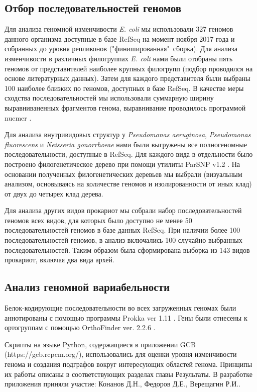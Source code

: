 \subsection{Отбор последовательностей геномов}
Для анализа геномной изменчивости \textit{E. coli} мы использовали 327 геномов данного организма доступные в базе RefSeq на момент ноября 2017 года и собранных до уровня репликонов ("финишированная"\ сборка). Для анализа изменчивости в различных филогруппах \textit{E. coli} нами были отобраны пять геномов от представителей наиболее крупных филогрупп (подбор проводился на основе литературных данных). Затем для каждого представителя были выбраны 100 наиболее близких по геномов, доступных в базе RefSeq. В качестве меры сходства последовательностей мы использовали суммарную ширину выравниваненных фрагментов генома, выравнивание проводилось программой nucmer \cite{marccais2018mummer4}. 

Для анализа внутривидовых структур у \textit{Pseudomonas aeruginosa}, \textit{Pseudomonas fluorescens} и \textit{Neisseria gonorrhoeae} нами были выгружены все полногеномные последовательности, доступные в RefSeq. Для каждого вида в отдельности было построено филогенетическое дерево при помощи утилиты ParSNP v1.2 \cite{treangen2014harvest}. На основании полученных филогенетических деревьев мы выбрали (визуальным анализом, основываясь на количестве геномов и изолированности от иных клад) от двух до четырех клад дерева. 

Для анализа других видов прокариот мы собрали набор последовательностей геномов всех видов, для которых было доступно не менее 50 последовательностей геномов в базе данных RefSeq. При наличии более 100 последовательностей геномов, в анализ включались 100 случайно выбранных последовательностей. Таким образом была сформирована выборка из 143 видов прокариот, включая два вида архей.

\subsection{Анализ геномной вариабельности}
Белок-кодирующие последовательности во всех загруженных геномах были аннотированы с помощью программы Prokka ver 1.11 \cite{seemann2014prokka}. Гены были отнесены к ортогруппам с помощью OrthoFinder ver. 2.2.6 \cite{emms2015orthofinder}. 

Скрипты на языке Python, содержащиеся в приложении GCB (https://gcb.rcpcm.org/), использовались для оценки уровня изменчивости генома и создания подграфов вокруг интересующих областей генома. Принципы их работы описаны в соответствующих разделах главы Результаты. В разработке приложения приняли участие: Конанов Д.Н., Федоров Д.Е., Верещагин Р.И.. 

